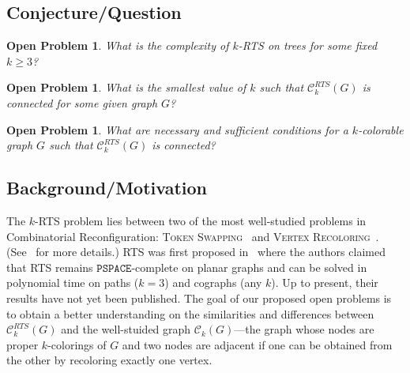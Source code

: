 \documentclass[a4paper]{article}
\newtheorem{problem}[theorem]{Open Problem}
\theoremstyle{definition}
\theoremstyle{remark}
\numberwithin{equation}{section}
\begin{document}
\subsection{Conjecture/Question}

\begin{problem}\label{recol-swap}
	What is the complexity of \textsc{$k$-RTS} on trees for some fixed $k \geq 3$?
\end{problem}

\begin{problem}\label{recol-swap-graph-conn}
	What is the smallest value of $k$ such that $\mathcal{C}_k^{RTS}(G)$ is connected for some given graph $G$?
\end{problem}

\begin{problem}\label{recol-swap-graph-conn2}
	What are necessary and sufficient conditions for a $k$-colorable graph $G$ such that $\mathcal{C}_{k}^{RTS}(G)$ is connected?
\end{problem}

\subsection{Background/Motivation}

The \textsc{$k$-RTS} problem lies between two of the most well-studied problems in Combinatorial Reconfiguration: \textsc{Token Swapping}~\cite{journals/tcs/YamanakaDIKKOSS15} and \textsc{Vertex Recoloring}~\cite{conf/mfcs/BonsmaC07}.
(See~\cite{journals/algorithms/Nishimura18,conf/seiccgtc/MynhardtN19} for more details.)
\textsc{RTS} was first proposed in~\cite{FischerF19} where the authors claimed that \textsc{RTS} remains $\mathtt{PSPACE}$-complete on planar graphs and can be solved in polynomial time on paths ($k = 3$) and cographs (any $k$).
Up to present, their results have not yet been published.
The goal of our proposed open problems is to obtain a better understanding on the similarities and differences between $\mathcal{C}_k^{RTS}(G)$ and the well-stuided graph $\mathcal{C}_k(G)$---the graph whose nodes are proper $k$-colorings of $G$ and two nodes are adjacent if one can be obtained from the other by recoloring exactly one vertex.



\end{document}
